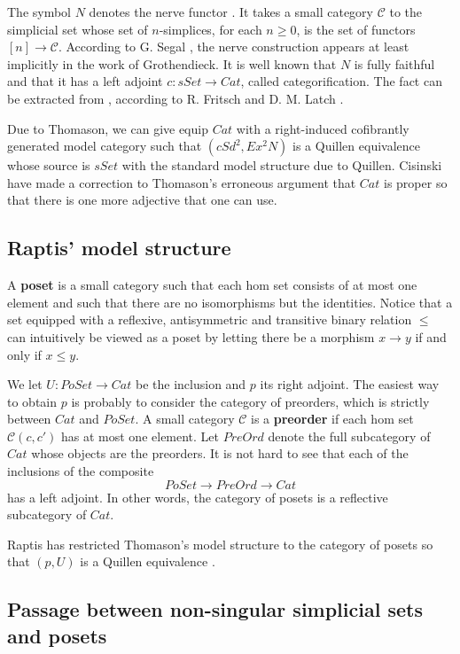 The symbol $N$ denotes the nerve functor \cite[p.~106]{Se68}. It takes a small category $\mathscr{C}$ to the simplicial set whose set of $n$-simplices, for each $n\geq 0$, is the set of functors $[n]\to \mathscr{C}$. According to G. Segal \cite[p.~105]{Se68}, the nerve construction appears at least implicitly in the work of Grothendieck. It is well known that $N$ is fully faithful and that it has a left adjoint $c:sSet\to Cat$, called categorification. The fact can be extracted from \cite{GZ67}, according to R. Fritsch and D. M. Latch \cite[p.~147]{FL81}.

Due to Thomason, we can give equip $Cat$ with a right-induced cofibrantly generated model category such that $(cSd^2,Ex^2N)$ is a Quillen equivalence \cite{Th80} whose source is $sSet$ with the standard model structure due to Quillen. Cisinski have made a correction to Thomason's erroneous argument that $Cat$ is proper \cite{Ci99} so that there is one more adjective that one can use.


\subsection{Raptis' model structure}

A \textbf{poset} is a small category such that each hom set consists of at most one element and such that there are no isomorphisms but the identities. Notice that a set equipped with a reflexive, antisymmetric and transitive binary relation $\leq$ can intuitively be viewed as a poset by letting there be a morphism $x\to y$ if and only if $x\leq y$.

We let $U:PoSet\to Cat$ be the inclusion and $p$ its right adjoint. The easiest way to obtain $p$ is probably to consider the category of preorders, which is strictly between $Cat$ and $PoSet$. A small category $\mathscr{C}$ is a \textbf{preorder} if each hom set $\mathscr{C} (c,c')$ has at most one element. Let $PreOrd$ denote the full subcategory of $Cat$ whose objects are the preorders. It is not hard to see that each of the inclusions of the composite
\[PoSet\to PreOrd\to Cat\]
has a left adjoint. In other words, the category of posets is a reflective subcategory of $Cat$. 

Raptis has restricted Thomason's model structure to the category of posets so that $(p,U)$ is a Quillen equivalence \cite{Ra10}.


\subsection{Passage between non-singular simplicial sets and posets}

